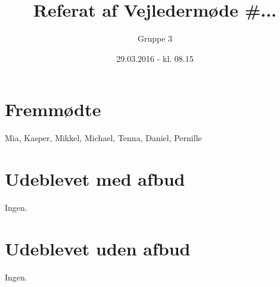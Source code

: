 \documentclass{article}
\title{Referat af Vejledermøde \#...}
\author{Gruppe 3}
\date{29.03.2016 - kl. 08.15}
\begin{document}
	\maketitle
	
	\section{Fremmødte}
	Mia, Kasper, Mikkel, Michael, Tenna, Daniel, Pernille
	
	\section{Udeblevet med afbud}
	Ingen. 
	
	\section{Udeblevet uden afbud}
	Ingen. 
	
\end{document}
